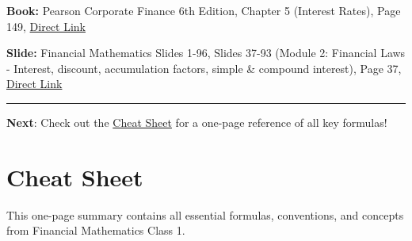\documentclass[
  letterpaper,
]{scrbook}
\begin{document}
\begin{tcolorbox}[enhanced jigsaw, toptitle=1mm, colbacktitle=quarto-callout-caution-color!10!white, opacityback=0, leftrule=.75mm, breakable, colframe=quarto-callout-caution-color-frame, toprule=.15mm, opacitybacktitle=0.6, coltitle=black, bottomrule=.15mm, colback=white, arc=.35mm, titlerule=0mm, rightrule=.15mm, left=2mm, title=\textcolor{quarto-callout-caution-color}{\faFire}\hspace{0.5em}{References}, bottomtitle=1mm]

\textbf{Book:} Pearson Corporate Finance 6th Edition, Chapter 5
(Interest Rates), Page 149,
\href{https://cdn.jsdelivr.net/gh/mrbungie/financial_maths@main/resources/books/pearson_corporate_finance_6th.pdf\#page=149}{Direct
Link}

\textbf{Slide:} Financial Mathematics Slides 1-96, Slides 37-93 (Module
2: Financial Laws - Interest, discount, accumulation factors, simple \&
compound interest), Page 37,
\href{https://cdn.jsdelivr.net/gh/mrbungie/financial_maths@main/resources/slideshows/25_09_30_FinancialMathematics_Slides_1_96.pdf\#page=37}{Direct
Link}

\end{tcolorbox}

\begin{center}\rule{0.5\linewidth}{0.5pt}\end{center}

\textbf{Next}: Check out the \href{cheat_sheet.qmd}{Cheat Sheet} for a
one-page reference of all key formulas!


\chapter*{Cheat Sheet}\label{cheat-sheet}


\begin{tcolorbox}[enhanced jigsaw, toptitle=1mm, colbacktitle=quarto-callout-note-color!10!white, opacityback=0, leftrule=.75mm, breakable, colframe=quarto-callout-note-color-frame, toprule=.15mm, opacitybacktitle=0.6, coltitle=black, bottomrule=.15mm, colback=white, arc=.35mm, titlerule=0mm, rightrule=.15mm, left=2mm, title={📋 Quick Reference Guide}, bottomtitle=1mm]

This one-page summary contains all essential formulas, conventions, and
concepts from Financial Mathematics Class 1.

\end{tcolorbox}
\end{document}
